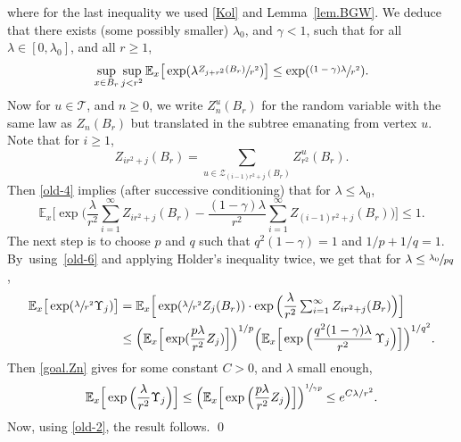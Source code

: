 \documentclass[JEP,XML,SOM,Unicode,NoFloatCountersInSection,published]{cedram}
\let\ts\textstyle
\theoremstyle{plain}
\theoremstyle{definition}
\newcommand\bE{\mathbb{E}}
\newcommand{\1}{{\text{\Large $\mathfrak 1$}}}
\begin{document}
where for the last inequality we used \eqref{Kol} and Lemma~\ref{lem.BGW}.
We deduce that there exists (some possibly smaller) $\lambda_0$, and $\gamma<1$, such that for
all $\lambda\in[0,\lambda_0]$, and all $r\ge 1$,
\begin{equation}\label{old-4}
\sup_{x\in B_r}\sup_{j<r^2}
\bE_x\big[\exp(\lambda \sfrac{Z_{j+r^2}(B_r)}{r^2})\big]
\le \exp(\sfrac{(1-\gamma)\lambda}{r^2}).
\end{equation}
Now for $u\in \mathcal T$, and $n\ge 0$, we write $Z^u_n(B_r)$ for the random variable with the same law as $Z_n(B_r)$ but translated in the subtree emanating from vertex $u$.
Note that for $i\ge 1$,
\begin{equation*}
Z_{ir^2+j}(B_r)=\sum_{u\in \mathcal Z_{(i-1)r^2+j}(B_r) }
Z^u_{r^2}(B_r).
\end{equation*}
Then \eqref{old-4} implies (after successive conditioning) that for $\lambda\le \lambda_0$,
\begin{equation}\label{old-6}
\bE_x\Big[\exp\Big(\frac{\lambda}{r^2}
\ts\sum_{i=1}^\infty Z_{i r^2+j}(B_r)
-\dfrac{(1-\gamma)\lambda}{r^2}
\sum_{i=1}^\infty Z_{(i-1)r^2+j}(B_r) \Big)\Big]\le 1.
\end{equation}
The next step is to choose $p$ and $q$ such that $q^2(1-\gamma)=1$ and $1/p+1/q=1$.
By~using~\eqref{old-6} and applying Holder's inequality twice, we get that for $\lambda \le \sfrac{\lambda_0}{pq}$,
\begin{equation*}
\begin{split}
\bE_x\big[\exp(\sfrac{\lambda}{r^2}\Upsilon_j)\big]& = \mathbb E_x\Big[\exp(
\sfrac{\lambda}{r^2} Z_j(B_r))\cdot \exp\Big(\dfrac{\lambda}{r^2}
\ts\sum_{i=1}^\infty Z_{ir^2+j}(B_r)\Big)\Big]\\
& \le \Big(\mathbb E_x\Big[\exp(\frac{p\lambda}{r^2} Z_j)\Big]\Big)^{1/p}
\Big(\mathbb E_x\Big[\exp \Big(\frac{q^2(1-\gamma)\lambda}{r^2}\,\Upsilon_j \Big)\Big]\Big)^{1/q^2}.
\end{split}
\end{equation*}
Then \eqref{goal.Zn} gives for some constant $C>0$, and $\lambda$ small enough,
\begin{equation*}
\bE_x \Big[\exp \Big(\frac{\lambda}{r^2}\Upsilon_j \Big) \Big]\le
\Big(\mathbb E_x \Big[\exp \Big(\frac{p\lambda}{r^2} Z_j \Big) \Big]\Big)^{\sfrac 1{\gamma p}}
\le e^{C \lambda/r^2}.
\end{equation*}
Now, using \eqref{old-2}, the result follows. \qed
\end{document}
